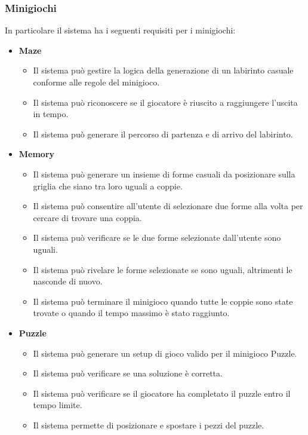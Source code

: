 \subsubsection{Minigiochi} \label{sec:functional-requirements:minigames}
In particolare il sistema ha i seguenti requisiti per i minigiochi:
\begin{itemize}
      \item \textbf{Maze}\par
            \begin{itemize}
                  \item Il sistema può gestire la logica della generazione di un labirinto 
                  casuale conforme alle regole del minigioco.
                  \item Il sistema può riconoscere se il giocatore è riuscito a raggiungere 
                  l'uscita in tempo.
                  \item Il sistema può generare il percorso di partenza e di arrivo del 
                  labirinto. 
            \end{itemize}
      \item \textbf{Memory}\par
            \begin{itemize}
                  \item Il sistema può generare un insieme di forme casuali da posizionare sulla griglia che siano 
                        tra loro uguali a coppie.
                  \item Il sistema può consentire all'utente di selezionare due forme alla volta
                        per cercare di trovare una coppia.
                  \item Il sistema può verificare se le due forme selezionate dall'utente sono uguali.
                  \item Il sistema può rivelare le forme selezionate se sono uguali, altrimenti le nasconde di nuovo.
                  \item Il sistema può terminare il minigioco quando tutte le coppie sono state trovate o quando il tempo massimo
                        è stato raggiunto.
            \end{itemize}
      \item \textbf{Puzzle} \par
            \begin{itemize}
                  \item Il sistema può generare un setup di gioco valido per il minigioco Puzzle.
                  \item Il sistema può verificare se una soluzione è corretta.
                  \item Il sistema può verificare se il giocatore ha completato il puzzle entro il tempo limite.
                  \item Il sistema permette di posizionare e spostare i pezzi del puzzle. 
            \end{itemize}
\end{itemize}